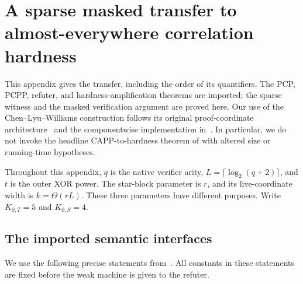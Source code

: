\documentclass[11pt,letterpaper]{article}
\theoremstyle{definition}
\theoremstyle{remark}
\begin{document}
\section{A sparse masked transfer to almost-everywhere correlation hardness}
\label{tr:appendix}

This appendix gives the transfer, including the order of its quantifiers.
The PCP, PCPP, refuter, and hardness-amplification theorems are imported;
the sparse witness and the masked verification argument are proved here.
Our use of the Chen--Lyu--Williams construction follows its original
proof-coordinate architecture~\cite[Section~6.2]{CLW} and the
componentwise implementation in~\cite[Appendix~C]{NagCubic}.
In particular, we do not invoke the headline CAPP-to-hardness theorem of
\cite{CLW} with altered size or running-time hypotheses.

Throughout this appendix, $q$ is the native verifier arity,
$L=\lceil\log_2(q+2)\rceil$, and $t$ is the outer XOR power.
The star-block parameter is $r$, and its live-coordinate width is
$k=\Theta(rL)$. These three parameters have different purposes.
Write $K_{0,T}=5$ and $K_{0,S}=4$.

\subsection{The imported semantic interfaces}
\label{tr:imports}

We use the following precise statements from~\cite{CLW}.
All constants in these statements are fixed before the weak machine is
given to the refuter.
\end{document}
